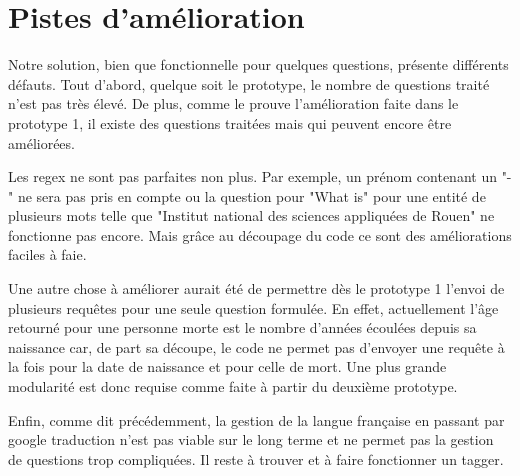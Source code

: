 \documentclass[11pt,a4paper]{article}
\begin{document}
\section*{Pistes d'amélioration}
Notre solution, bien que fonctionnelle pour quelques questions, présente différents défauts. Tout d'abord, quelque soit le prototype, le nombre de questions traité n'est pas très élevé. 
De plus, comme le prouve l'amélioration faite dans le prototype 1, il existe des questions traitées mais qui peuvent encore être améliorées.\par 
Les regex ne sont pas parfaites non plus. Par exemple, un prénom contenant un "-" ne sera pas pris en compte ou la question pour "What is" pour une entité de plusieurs mots telle que "Institut national des sciences appliquées de Rouen" ne fonctionne pas encore. Mais grâce au découpage du code ce sont des améliorations faciles à faie.\par
Une autre chose à améliorer aurait été de permettre dès le prototype 1 l'envoi de plusieurs requêtes pour une seule question formulée. En effet, actuellement l'âge retourné pour une personne morte est le nombre d'années écoulées depuis sa naissance car, de part sa découpe, le code ne permet pas d'envoyer une requête à la fois pour la date de naissance et pour celle de mort. Une plus grande modularité est donc requise comme faite à partir du deuxième prototype. \par
Enfin, comme dit précédemment, la gestion de la langue française en passant par google traduction n'est pas viable sur le long terme et ne permet pas la gestion de questions trop compliquées. Il reste à trouver et à faire fonctionner un tagger.
\end{document}
